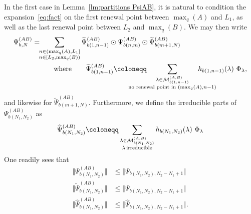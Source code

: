 \documentclass[letterpaper, DIV=17]{scrartcl}
\numberwithin{equation}{section}
\theoremstyle{definition}
\newcommand{\irr}{\small \textrm{irreducible}}
\begin{document}
In the first case in Lemma~\ref{lm:partitions PsiAB}, it is natural to condition the expansion~\eqref{eq:fact} on the first renewal point between $ \max_q(A) $ and $ L_1 $, as well as the last renewal point between $ L_2 $ and $ \max_q(B) $. We may then write 
\begin{align}\label{eq:maincasecond}
	\Psi_{b, N}^{(AB)} = 
	& \mkern-5mu \sum_{\substack{ n \in (  \max_q(A) , L_1 ] \\  n \in [L_2 ,  \max_q(B) ) }}  \widetilde \Psi_{b(1,n-1)}^{(AB)} \odot   \Psi_{b(n,m)}^{(AB)}  \odot \widetilde \Psi_{b(m+1,N)}^{(AB)} \\
&\qquad \mbox{where} \qquad 
	 \widetilde \Psi_{b(1,n-1)}^{(AB)}  \coloneqq  \mkern-50mu \sum_{\substack{\lambda \in \mathcal{M}_{b(1,n-1)}^{(A,B)}\\ \text{no renewal point in } (\max_q(A), n-1)}}  \mkern-50mu  h_{b(1,n-1)}(\lambda)\  \Phi_\lambda , \notag
\end{align}
and likewise for $ \widetilde \Psi_{b(m+1,N)}^{(AB)} $. Furthermore, we define the irreducible parts of $\Psi_{b(N_1,N_2)}^{(AB)}$ as 
\begin{equation}
	\widehat\Psi_{b(N_1, N_2)}^{(AB)} \coloneqq \sum_{\substack{\lambda \in \mathcal{M}_{b(N_1, N_2)}^{(A,B)} \\ \lambda \, \irr}} h_{b(N_1, N_2)}(\lambda) \ \Phi_{\lambda}
\end{equation}
One readily sees that
\begin{equation} \label{norms truncated vs untruncated}
	\begin{split}
			\Vert \Psi_{b(N_1,N_2)}^{(AB)} \Vert &\leq \Vert \Psi_{b(N_1, N_2), N_2-N_1+1} \Vert \\
			\Vert \widetilde{\Psi}_{b(N_1,N_2)}^{(AB)} \Vert &\leq \Vert \Psi_{b(N_1, N_2), N_2-N_1+1} \Vert \\
			\Vert \widehat{\Psi}_{b(N_1,N_2)}^{(AB)} \Vert &\leq \Vert \widehat \Psi_{b(N_1, N_2), N_2-N_1+1} \Vert.
	\end{split}
	\end{equation}
\end{document}
